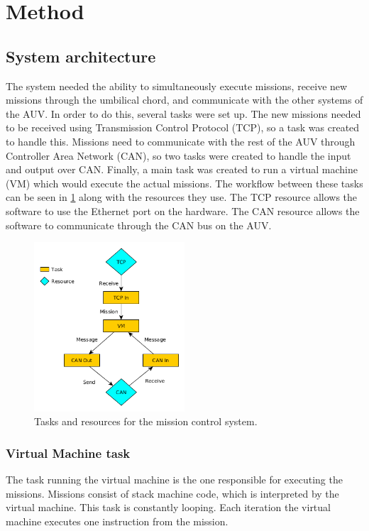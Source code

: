 \section{Method}\label{sec:method}

\subsection{System architecture}
The system needed the ability to simultaneously execute missions, receive new missions through the umbilical chord, and communicate with the other systems of the AUV. In order to do this, several tasks were set up. The new missions needed to be received using Transmission Control Protocol (TCP), so a task was created to handle this. Missions need to communicate with the rest of the AUV through Controller Area Network (CAN), so two tasks were created to handle the input and output over CAN. Finally, a main task was created to run a virtual machine (VM) which would execute the actual missions. The workflow between these tasks can be seen in \cref{fig:data_flow_figure} along with the resources they use. The TCP resource allows the software to use the Ethernet port on the hardware. The CAN resource allows the software to communicate through the CAN bus on the AUV.

\pageref{fig:data_flow_figure}
\begin{figure}[h]
    \includegraphics[width=0.5\textwidth]{./figure/figureTasksAndResources.png}
    \caption{Tasks and resources for the mission control system.}
    \label{fig:data_flow_figure}
\end{figure}

\subsubsection{Virtual Machine task}
The task running the virtual machine is the one responsible for executing the missions. Missions consist of stack machine code, which is interpreted by the virtual machine. This task is constantly looping. Each iteration the virtual machine executes one instruction from the mission.

